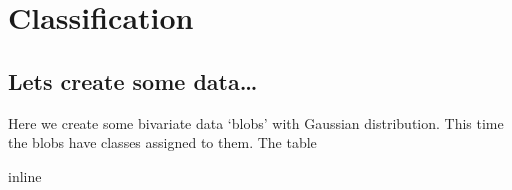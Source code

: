 \documentclass[letterpaper,10pt,english]{sphinxmanual}
\begin{document}
\chapter{Classification}
\label{\detokenize{05-SupervisedSegmentation:classification}}

\section{Lets create some data…}
\label{\detokenize{05-SupervisedSegmentation:lets-create-some-data}}
\sphinxAtStartPar
Here we create some bivariate data ‘blobs’ with Gaussian distribution. This time the blobs have classes assigned to them. The table

\begin{sphinxVerbatim}[commandchars=\\\{\}]
   
   
   
   
 inline
\end{sphinxVerbatim}
\end{document}
